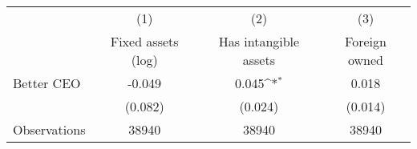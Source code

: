 {
\def\sym#1{\ifmmode^{#1}\else\(^{#1}\)\fi}
\begin{tabular}{l*{3}{c}}
\hline\hline
                    &\multicolumn{1}{c}{(1)}&\multicolumn{1}{c}{(2)}&\multicolumn{1}{c}{(3)}\\
                    &\multicolumn{1}{c}{Fixed assets (log)}&\multicolumn{1}{c}{Has intangible assets}&\multicolumn{1}{c}{Foreign owned}\\
\hline
Better CEO          &      -0.049         &       0.045\sym{*}  &       0.018         \\
                    &     (0.082)         &     (0.024)         &     (0.014)         \\
\hline
Observations        &       38940         &       38940         &       38940         \\
\hline\hline
\end{tabular}
}
